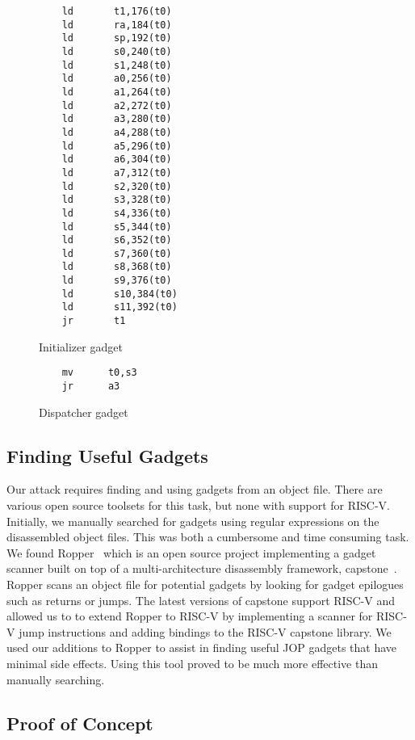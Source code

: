 \begin{figure}
    \caption{Initializer gadget}
    \label{initializer gadget}
    \begin{lstlisting}
    ld       t1,176(t0)
    ld       ra,184(t0)
    ld       sp,192(t0)
    ld	     s0,240(t0)
    ld	     s1,248(t0)
    ld	     a0,256(t0)
    ld	     a1,264(t0)
    ld	     a2,272(t0)
    ld	     a3,280(t0)
    ld	     a4,288(t0)
    ld	     a5,296(t0)
    ld	     a6,304(t0)
    ld	     a7,312(t0)
    ld	     s2,320(t0)
    ld	     s3,328(t0)
    ld	     s4,336(t0)
    ld	     s5,344(t0)
    ld	     s6,352(t0)
    ld	     s7,360(t0)
    ld	     s8,368(t0)
    ld	     s9,376(t0)
    ld	     s10,384(t0)
    ld	     s11,392(t0)
    jr	     t1
    \end{lstlisting}
\end{figure}

\begin{figure}
    \caption{Dispatcher gadget}
    \label{dispatcher gadget}
    \begin{lstlisting}
    mv      t0,s3
    jr      a3
    \end{lstlisting}
\end{figure}

\subsection{Finding Useful Gadgets}
Our attack requires finding and using gadgets from an object file. There are
various open source toolsets for this task, but none with support for RISC-V.
Initially, we manually searched for gadgets using regular expressions on the disassembled
object files. This was both a cumbersome and time consuming task. We found Ropper~\cite{ropper}
which is an open source project implementing a gadget scanner built on top of a
multi-architecture disassembly framework, capstone~\cite{capstone}. Ropper scans an
object file for potential gadgets by looking for gadget epilogues such as returns or jumps.
The latest versions of capstone support RISC-V and allowed us to to extend Ropper to RISC-V by implementing a
scanner for RISC-V jump instructions and adding bindings to the RISC-V capstone library.
We used our additions to Ropper to assist in finding useful JOP gadgets that have minimal
side effects. Using this tool proved to be much more effective than manually searching.

\subsection{Proof of Concept}

